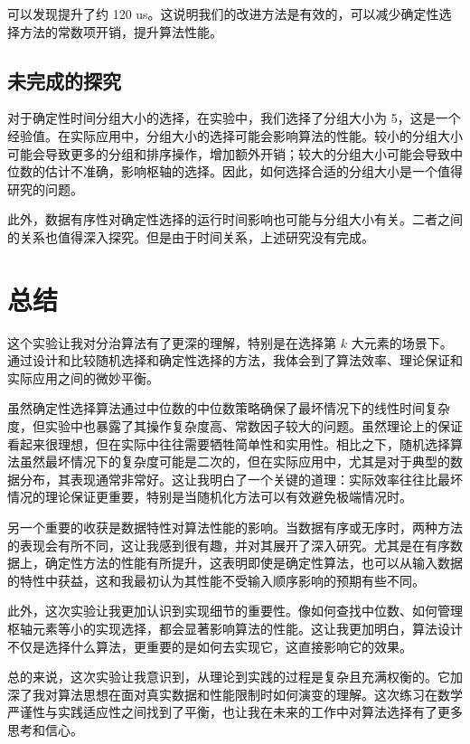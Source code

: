 可以发现提升了约 120 us。这说明我们的改进方法是有效的，可以减少确定性选择方法的常数项开销，提升算法性能。

\subsection{未完成的探究}

对于确定性时间分组大小的选择，在实验中，我们选择了分组大小为 5，这是一个经验值。在实际应用中，分组大小的选择可能会影响算法的性能。较小的分组大小可能会导致更多的分组和排序操作，增加额外开销；较大的分组大小可能会导致中位数的估计不准确，影响枢轴的选择。因此，如何选择合适的分组大小是一个值得研究的问题。

此外，数据有序性对确定性选择的运行时间影响也可能与分组大小有关。二者之间的关系也值得深入探究。但是由于时间关系，上述研究没有完成。

\section{总结}

这个实验让我对分治算法有了更深的理解，特别是在选择第 $k$ 大元素的场景下。通过设计和比较随机选择和确定性选择的方法，我体会到了算法效率、理论保证和实际应用之间的微妙平衡。

虽然确定性选择算法通过中位数的中位数策略确保了最坏情况下的线性时间复杂度，但实验中也暴露了其操作复杂度高、常数因子较大的问题。虽然理论上的保证看起来很理想，但在实际中往往需要牺牲简单性和实用性。相比之下，随机选择算法虽然最坏情况下的复杂度可能是二次的，但在实际应用中，尤其是对于典型的数据分布，其表现通常非常好。这让我明白了一个关键的道理：实际效率往往比最坏情况的理论保证更重要，特别是当随机化方法可以有效避免极端情况时。

另一个重要的收获是数据特性对算法性能的影响。当数据有序或无序时，两种方法的表现会有所不同，这让我感到很有趣，并对其展开了深入研究。尤其是在有序数据上，确定性方法的性能有所提升，这表明即使是确定性算法，也可以从输入数据的特性中获益，这和我最初认为其性能不受输入顺序影响的预期有些不同。

此外，这次实验让我更加认识到实现细节的重要性。像如何查找中位数、如何管理枢轴元素等小的实现选择，都会显著影响算法的性能。这让我更加明白，算法设计不仅是选择什么算法，更重要的是如何去实现它，这直接影响它的效果。

总的来说，这次实验让我意识到，从理论到实践的过程是复杂且充满权衡的。它加深了我对算法思想在面对真实数据和性能限制时如何演变的理解。这次练习在数学严谨性与实践适应性之间找到了平衡，也让我在未来的工作中对算法选择有了更多思考和信心。

